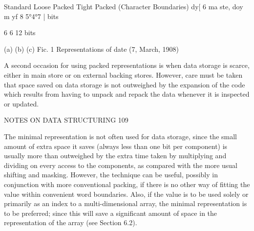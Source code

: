 Standard Loose Packed Tight Packed (Character Boundaries) dy[ 6 ma ste, doy m yf 8 5°4°7 | bits

6 6 12 bits

(a) (b) (c) Fic. 1 Representations of date (7, March, 1908)

A second occasion for using packed representations is when data storage is scarce, either in main store or on external backing stores. However, care must be taken that space saved on data storage is not outweighed by the expansion of the code which results from having to unpack and repack the data whenever it is inspected or updated.

NOTES ON DATA STRUCTURING 109

The minimal representation is not often used for data storage, since the small amount of extra space it saves (always less than one bit per component) is usually more than outweighed by the extra time taken by multiplying and dividing on every access to the components, as compared with the more usual shifting and masking. However, the technique can be useful, possibly in conjunction with more conventional packing, if there is no other way of fitting the value within convenient word boundaries. Also, if the value is to be used solely or primarily as an index to a multi-dimensional array, the minimal representation is to be preferred; since this will save a significant amount of space in the representation of the array (see Section 6.2).


